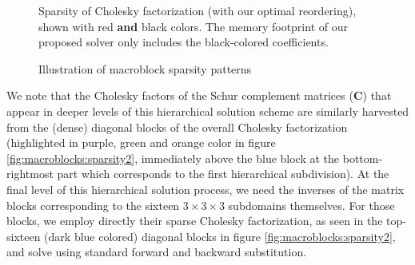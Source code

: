 \begin{figure}[h]


\caption{Illustration of macroblock sparsity patterns}{Sparsity of
  Cholesky factorization (with our optimal reordering), shown with red
  \textbf{and} black colors. The memory footprint of our proposed
  solver only includes the black-colored coefficients.}
\label{fig:macroblocks:sparsity}
\end{figure}

We note that the Cholesky factors of the Schur complement matrices
($\mathbf{C}$) that appear in deeper levels of this hierarchical
solution scheme are similarly harvested from the (dense) diagonal
blocks of the overall Cholesky factorization (highlighted in purple,
green and orange color in figure \ref{fig:macroblocks:sparsity2}, immediately
above the blue block at the bottom-rightmost part which corresponds to
the first hierarchical subdivision). At the final level of this
hierarchical solution process, we need the inverses of the matrix
blocks corresponding to the sixteen $3\times 3\times 3$ subdomains
themselves. For those blocks, we employ directly their sparse Cholesky
factorization, as seen in the top-sixteen (dark blue colored) diagonal
blocks in figure \ref{fig:macroblocks:sparsity2}, and solve using standard forward
and backward substitution.

